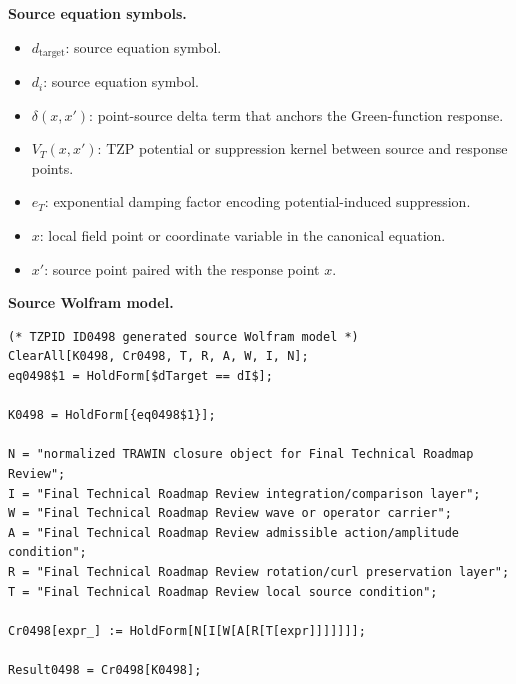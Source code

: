 \begin{minipage}[t]{0.49\linewidth}
\begingroup
\small
\raggedright
\textbf{Source equation symbols.}\par
\begin{itemize}[leftmargin=1.35em,itemsep=1pt,topsep=1pt,parsep=0pt]
    \item $d_{\mathrm{target}}$: source equation symbol.
    \item $d_i$: source equation symbol.
    \item $\delta(x,x')$: point-source delta term that anchors the Green-function response.
    \item $V_{T}(x,x')$: TZP potential or suppression kernel between source and response points.
    \item $e_T$: exponential damping factor encoding potential-induced suppression.
    \item $x$: local field point or coordinate variable in the canonical equation.
    \item $x'$: source point paired with the response point $x$.
\end{itemize}
\endgroup
\end{minipage}\hfill
\begin{minipage}[t]{0.47\linewidth}
\begingroup
\scriptsize
\raggedright
\textbf{Source Wolfram model.}\par
\begin{Verbatim}[fontsize=\tiny,breaklines=true,breakanywhere=true]
(* TZPID ID0498 generated source Wolfram model *)
ClearAll[K0498, Cr0498, T, R, A, W, I, N];
eq0498$1 = HoldForm[$dTarget == dI$];

K0498 = HoldForm[{eq0498$1}];

N = "normalized TRAWIN closure object for Final Technical Roadmap Review";
I = "Final Technical Roadmap Review integration/comparison layer";
W = "Final Technical Roadmap Review wave or operator carrier";
A = "Final Technical Roadmap Review admissible action/amplitude condition";
R = "Final Technical Roadmap Review rotation/curl preservation layer";
T = "Final Technical Roadmap Review local source condition";

Cr0498[expr_] := HoldForm[N[I[W[A[R[T[expr]]]]]]];

Result0498 = Cr0498[K0498];
\end{Verbatim}
\endgroup
\end{minipage}

